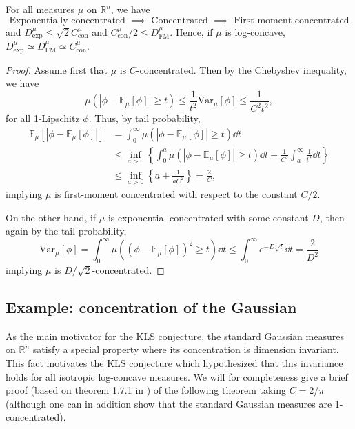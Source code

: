 \begin{proposition}\label{thm:equiv}
  For all measures \(\mu\) on \(\mathbb{R}^n\), we have 
  \[\text{Exponentially concentrated \(\implies\) Concentrated \(\implies\) First-moment concentrated}\]
  and \(D^\mu_{\text{exp}} \le \sqrt{2} C^\mu_{\text{con}}\) and 
  \(C^\mu_{\text{con}} / 2 \le D^\mu_{\text{FM}}\).
  Hence, if \(\mu\) is log-concave, 
  \(D^\mu_{\text{exp}} \simeq D^\mu_{\text{FM}} \simeq C^\mu_{\text{con}}\).
\end{proposition}
\begin{proof}
  Assume first that \(\mu\) is \(C\)-concentrated. Then by the Chebyshev inequality, we have 
  \[\mu(|\phi - \mathbb{E}_\mu[\phi]| \ge t) 
      \le \frac{1}{t^2}\text{Var}_\mu[\phi] 
      \le \frac{1}{C^2t^2},\]
  for all 1-Lipschitz \(\phi\). 
  Thus, by tail probability,
  \begin{align*}\mathbb{E}_\mu[|\phi - \mathbb{E}_\mu[\phi]|] 
    & = \int_0^\infty \mu(|\phi - \mathbb{E}_\mu[\phi]| \ge t) \dd t\\ 
    & \le \inf_{a > 0} \left\{\int_0^a \mu(|\phi - \mathbb{E}_\mu[\phi]| \ge t) \dd t + \frac{1}{C^2} \int_a^\infty \frac{1}{t^2} \dd t\right\}\\ 
    & \le \inf_{a > 0} \left\{a + \frac{1}{aC^2}\right\} = \frac{2}{C},
  \end{align*}
  implying \(\mu\) is first-moment concentrated with respect to the constant \(C / 2\).

  On the other hand, if \(\mu\) is exponential concentrated with some constant \(D\), then 
  again by the tail probability, 
  \[\text{Var}_\mu[\phi] = \int_0^\infty \mu((\phi - \mathbb{E}_\mu[\phi])^2 \ge t) \dd t
      \le \int_0^\infty e^{-D \sqrt{t}} \dd t = \frac{2}{D^2}\]
  implying \(\mu\) is \(D / \sqrt{2}\)-concentrated.
\end{proof}

\subsection{Example: concentration of the Gaussian}\label{sec:gaussian_conc}

As the main motivator for the KLS conjecture, the standard Gaussian measures on \(\mathbb{R}^n\) satisfy 
a special property where its concentration is dimension invariant.
This fact motivates the KLS conjecture which hypothesized that 
this invariance holds for all isotropic log-concave measures. We will 
for completeness give a brief proof (based on theorem 1.7.1 in \cite{Bogachev_1998}) of the following 
theorem taking \(C = 2 / \pi\) (although one can in addition show that the standard Gaussian measures are 1-concentrated).


